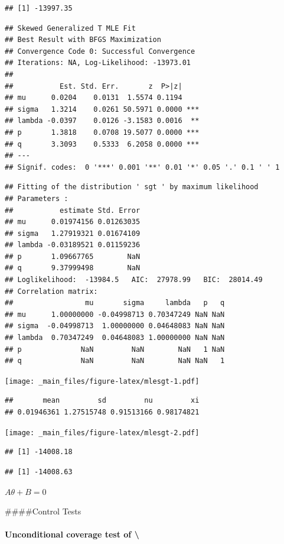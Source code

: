 \documentclass[a4paper, twoside]{templates/ociamthesis}
\begin{document}
\begin{verbatim}
## [1] -13997.35
\end{verbatim}

\begin{verbatim}
## Skewed Generalized T MLE Fit
## Best Result with BFGS Maximization
## Convergence Code 0: Successful Convergence
## Iterations: NA, Log-Likelihood: -13973.01 
## 
##           Est. Std. Err.       z  P>|z|    
## mu      0.0204    0.0131  1.5574 0.1194    
## sigma   1.3214    0.0261 50.5971 0.0000 ***
## lambda -0.0397    0.0126 -3.1583 0.0016  **
## p       1.3818    0.0708 19.5077 0.0000 ***
## q       3.3093    0.5333  6.2058 0.0000 ***
## ---
## Signif. codes:  0 '***' 0.001 '**' 0.01 '*' 0.05 '.' 0.1 ' ' 1
\end{verbatim}

\begin{verbatim}
## Fitting of the distribution ' sgt ' by maximum likelihood 
## Parameters : 
##           estimate Std. Error
## mu      0.01974156 0.01263035
## sigma   1.27919321 0.01674109
## lambda -0.03189521 0.01159236
## p       1.09667765        NaN
## q       9.37999498        NaN
## Loglikelihood:  -13984.5   AIC:  27978.99   BIC:  28014.49 
## Correlation matrix:
##                 mu       sigma     lambda   p   q
## mu      1.00000000 -0.04998713 0.70347249 NaN NaN
## sigma  -0.04998713  1.00000000 0.04648083 NaN NaN
## lambda  0.70347249  0.04648083 1.00000000 NaN NaN
## p              NaN         NaN        NaN   1 NaN
## q              NaN         NaN        NaN NaN   1
\end{verbatim}

\texttt{[image: \_main\_files/figure-latex/mlesgt-1.pdf]}

\begin{verbatim}
##       mean         sd         nu         xi 
## 0.01946361 1.27515748 0.91513166 0.98174821
\end{verbatim}

\texttt{[image: \_main\_files/figure-latex/mlesgt-2.pdf]}

\begin{verbatim}
## [1] -14008.18
\end{verbatim}

\begin{verbatim}
## [1] -14008.63
\end{verbatim}

\(A \theta + B = 0\)

\#\#\#\#Control Tests

\hypertarget{unconditional-coverage-test-of-kupiec1995}{%
\paragraph{\texorpdfstring{Unconditional coverage test of \textcite{kupiec1995} \textbackslash{}}{Unconditional coverage test of @kupiec1995 \textbackslash{}}}\label{unconditional-coverage-test-of-kupiec1995}}
\end{document}
